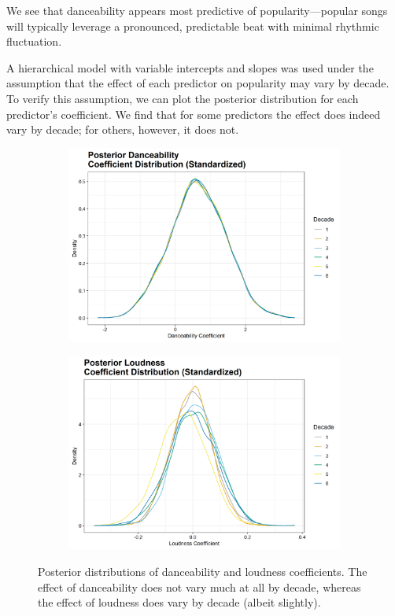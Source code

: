 \documentclass[12pt, twoside]{article}
\begin{document}
We see that danceability appears most predictive of popularity---popular songs will typically leverage a pronounced, predictable beat with minimal rhythmic fluctuation. 

A hierarchical model with variable intercepts and slopes was used under the assumption that the effect of each predictor on popularity may vary by decade. To verify this assumption, we can plot the posterior distribution for each predictor's coefficient. We find that for some predictors the effect does indeed vary by decade; for others, however, it does not.

\begin{figure}[H]
\begin{subfigure}[b]{0.5\textwidth}
\centering
\includegraphics[width = \textwidth]{danceabiltiy_dist.png}
\caption{}
\label{fig:prior}
\end{subfigure}
\begin{subfigure}[b]{0.5\textwidth}
\centering
\includegraphics[width = \textwidth]{loudness_dist.png}
\caption{}
\label{fig:post}
\end{subfigure}
\caption{Posterior distributions of danceability and loudness coefficients. The effect of danceability does not vary much at all by decade, whereas the effect of loudness does vary by decade (albeit slightly). }
\end{figure}
\end{document}
